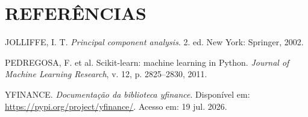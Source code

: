 \documentclass[12pt,oneside,a4paper,brazil,sumario=tradicional]{abntex2}
\begin{document}
\postextual

{}
\section*{REFERÊNCIAS}

\noindent
JOLLIFFE, I. T. \emph{Principal component analysis}. 2. ed. New York: Springer,
2002.

\vspace{0.5\baselineskip}
\noindent
PEDREGOSA, F. et al. Scikit-learn: machine learning in Python. \emph{Journal of
Machine Learning Research}, v. 12, p. 2825--2830, 2011.

\vspace{0.5\baselineskip}
\noindent
YFINANCE. \emph{Documentação da biblioteca yfinance}. Disponível em:
\url{https://pypi.org/project/yfinance/}. Acesso em: 19 jul. 2026.
\end{document}
